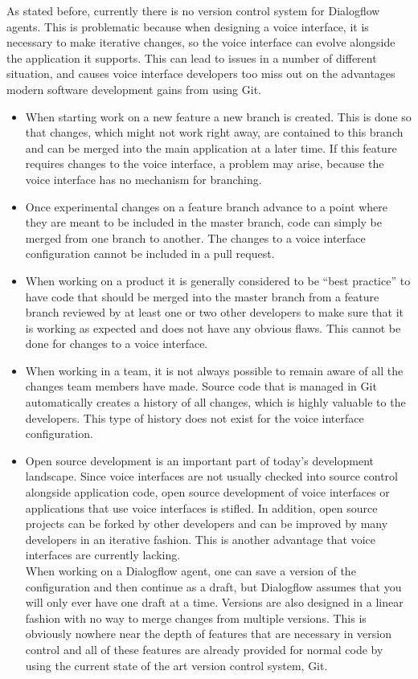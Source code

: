 As stated before, currently there is no version control system for Dialogflow agents.
This is problematic because when designing a voice interface, it is necessary to make iterative changes, so the voice interface can evolve alongside the application it supports. This can lead to issues in a number of different situation, and causes voice interface developers too miss out on the advantages modern software development gains from using Git.
\begin{itemize}
    \item When starting work on a new feature a new branch is created. This is done so that changes, which might not work right away, are contained to this branch and can be merged into the main application at a later time. If this feature requires changes to the voice interface, a problem may arise, because the voice interface has no mechanism for branching.
    \item Once experimental changes on a feature branch advance to a point where they are meant to be included in the master branch, code can simply be merged from one branch to another. The changes to a voice interface configuration cannot be included in a pull request.
    \item When working on a product it is generally considered to be “best practice” to have code that should be merged into the master branch from a feature branch reviewed by at least one or two other developers to make sure that it is working as expected and does not have any obvious flaws. This cannot be done for changes to a voice interface.
    \item When working in a team, it is not always possible to remain aware of all the changes team members have made. Source code that is managed in Git automatically creates a history of all changes, which is highly valuable to the developers. This type of history does not exist for the voice interface configuration.
    \item Open source development is an important part of today's development landscape. Since voice interfaces are not usually checked into source control alongside application code, open source development of voice interfaces or applications that use voice interfaces is stifled. In addition, open source projects can be forked by other developers and can be improved by many developers in an iterative fashion. This is another advantage that voice interfaces are currently lacking. \\
          When working on a Dialogflow agent, one can save a version of the configuration and then continue as a draft, but Dialogflow assumes that you will only ever have one draft at a time. Versions are also designed in a linear fashion with no way to merge changes from multiple versions. This is obviously nowhere near the depth of features that are necessary in version control and all of these features are already provided for normal code by using the current state of the art version control system, Git.
\end{itemize}

